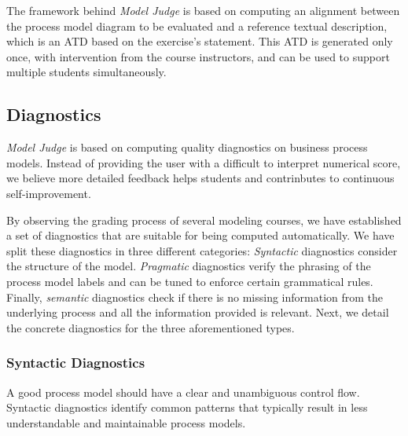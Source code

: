 The framework behind \emph{Model Judge} is based on computing an alignment
between the process model diagram to be evaluated and a reference textual
description, which is an ATD based on the exercise's statement. This ATD is
generated only once, with intervention from the course instructors, and can be
used to support multiple students simultaneously.


\subsection{Diagnostics}

\emph{Model Judge} is based on computing quality diagnostics on business process
models. Instead of providing the user with a difficult to interpret numerical
score, we believe more detailed feedback helps students and contrinbutes to
continuous self-improvement.

By observing the grading process of several modeling courses, we have
established a set of diagnostics that are suitable for being computed
automatically. We have split these diagnostics in three different categories:
\emph{Syntactic} diagnostics consider the structure of the model.
\emph{Pragmatic} diagnostics verify the phrasing of the process model labels and
can be tuned to enforce certain grammatical rules. Finally, \emph{semantic}
diagnostics check if there is no missing information from the underlying process
and all the information provided is relevant. Next, we detail the concrete
diagnostics for the three aforementioned types.

\subsubsection{Syntactic Diagnostics}

A good process model should have a clear and unambiguous control flow.
Syntactic diagnostics identify common patterns that typically result in
less understandable and maintainable process models.

